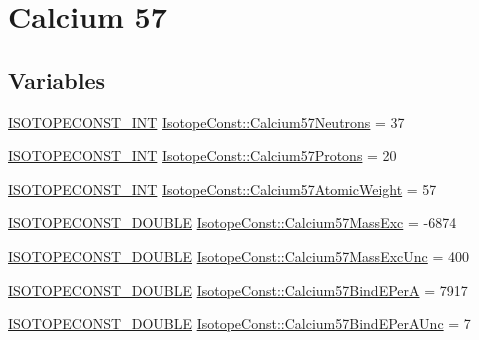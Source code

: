 \hypertarget{group___isotope_const-_calcium-_ca57}{}\section{Calcium 57}
\label{group___isotope_const-_calcium-_ca57}
\subsection*{Variables}
\begin{DoxyCompactItemize}
\item 
\mbox{\hyperlink{group___isotope_const-_macros_ga5f18360b3e99483a35c32d789e62621c}{I\+S\+O\+T\+O\+P\+E\+C\+O\+N\+S\+T\+\_\+\+I\+NT}} \mbox{\hyperlink{group___isotope_const-_calcium-_ca57_gab96e57bde9675c2721c1a42f5ab93e0e}{Isotope\+Const\+::\+Calcium57\+Neutrons}} = 37
\item 
\mbox{\hyperlink{group___isotope_const-_macros_ga5f18360b3e99483a35c32d789e62621c}{I\+S\+O\+T\+O\+P\+E\+C\+O\+N\+S\+T\+\_\+\+I\+NT}} \mbox{\hyperlink{group___isotope_const-_calcium-_ca57_ga15d31ee4796833cae297f77ee9920bb7}{Isotope\+Const\+::\+Calcium57\+Protons}} = 20
\item 
\mbox{\hyperlink{group___isotope_const-_macros_ga5f18360b3e99483a35c32d789e62621c}{I\+S\+O\+T\+O\+P\+E\+C\+O\+N\+S\+T\+\_\+\+I\+NT}} \mbox{\hyperlink{group___isotope_const-_calcium-_ca57_ga9ed80ddfa36e22f8c7cd504803e608b2}{Isotope\+Const\+::\+Calcium57\+Atomic\+Weight}} = 57
\item 
\mbox{\hyperlink{group___isotope_const-_macros_ga8f45a7272ce02c0b4c65c44636ed719a}{I\+S\+O\+T\+O\+P\+E\+C\+O\+N\+S\+T\+\_\+\+D\+O\+U\+B\+LE}} \mbox{\hyperlink{group___isotope_const-_calcium-_ca57_ga4e967462dc9d77238b58cc7e6f7112d1}{Isotope\+Const\+::\+Calcium57\+Mass\+Exc}} = -\/6874
\item 
\mbox{\hyperlink{group___isotope_const-_macros_ga8f45a7272ce02c0b4c65c44636ed719a}{I\+S\+O\+T\+O\+P\+E\+C\+O\+N\+S\+T\+\_\+\+D\+O\+U\+B\+LE}} \mbox{\hyperlink{group___isotope_const-_calcium-_ca57_ga1e7dacc5aa17ebd7445e5be1ec61ed2b}{Isotope\+Const\+::\+Calcium57\+Mass\+Exc\+Unc}} = 400
\item 
\mbox{\hyperlink{group___isotope_const-_macros_ga8f45a7272ce02c0b4c65c44636ed719a}{I\+S\+O\+T\+O\+P\+E\+C\+O\+N\+S\+T\+\_\+\+D\+O\+U\+B\+LE}} \mbox{\hyperlink{group___isotope_const-_calcium-_ca57_gae633f907b2c6571fdcdd2b8bbe4c61ec}{Isotope\+Const\+::\+Calcium57\+Bind\+E\+PerA}} = 7917
\item 
\mbox{\hyperlink{group___isotope_const-_macros_ga8f45a7272ce02c0b4c65c44636ed719a}{I\+S\+O\+T\+O\+P\+E\+C\+O\+N\+S\+T\+\_\+\+D\+O\+U\+B\+LE}} \mbox{\hyperlink{group___isotope_const-_calcium-_ca57_gac35a32f9b3644afc5861a213c67b053a}{Isotope\+Const\+::\+Calcium57\+Bind\+E\+Per\+A\+Unc}} = 7

\end{DoxyCompactItemize}
